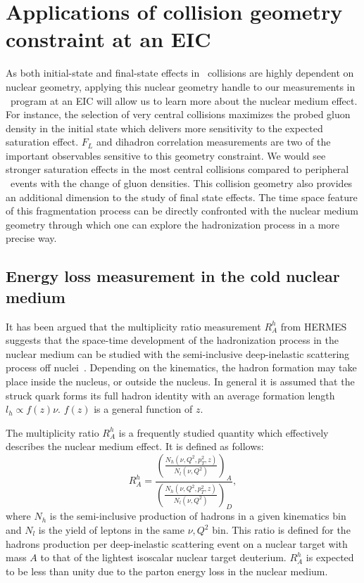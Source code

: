 \section{Applications of collision geometry constraint at an EIC}\label{sec:application}

As both initial-state and final-state effects in \eA\ collisions are highly dependent
on nuclear geometry, applying this nuclear geometry handle to our
measurements in \eA\ program at an EIC will allow us to learn more
about the nuclear medium effect. For instance, the selection of very
central collisions maximizes the probed gluon density in the initial state which
delivers more sensitivity to the expected saturation effect. $F_{L}$ and dihadron
correlation measurements are two of the important observables sensitive to this
geometry constraint. We would see stronger saturation effects in the most
central collisions compared to peripheral \eA\ events with the change of
gluon densities. This collision geometry also provides an additional dimension to
the study of final state effects. The time space feature of this fragmentation
process can be directly confronted with the nuclear medium geometry through
which one can explore the hadronization process in a more precise way.


\subsection{Energy loss measurement in the cold nuclear medium}
It has been argued that the multiplicity ratio measurement $R^{h}_{A}$ from
HERMES suggests that the space-time development of the hadronization process in
the nuclear medium can be studied with the semi-inclusive deep-inelastic
scattering process off nuclei~\cite{Airapetian:2003mi,Airapetian:2007vu,Airapetian:2011jp}. Depending on the
kinematics, the hadron formation may take place inside the nucleus, or
outside the nucleus. In general it is assumed that the struck quark forms its
full hadron identity with an average formation length $l_{h}\propto f(z)\nu$. $f(z)$ is a general function of $z$.

The multiplicity ratio $R^{h}_{A}$ is a frequently studied quantity
which effectively describes the nuclear medium effect. It is defined as follows:
\begin{equation}
R^{h}_{A}=\frac{(\frac{N_{h}(\nu,Q^{2},p^{2}_{T},z)}{N_{l}(\nu,Q^{2})})_{A}}{(\frac{N_{h}(\nu,Q^{2},p^{2}_{T},z)}{N_{l}(\nu,Q^{2})})_{D}},
\end{equation}
where $N_{h}$ is the semi-inclusive production of hadrons in a given kinematics
bin and $N_{l}$ is the yield of leptons in the same $\nu,Q^{2}$ bin. This ratio
is defined for the hadrons production per deep-inelastic scattering event on a
nuclear target with mass $A$ to that of the lightest isoscalar nuclear target
deuterium. $R^{h}_{A}$ is expected to be less than unity due to the parton energy loss in the nuclear medium.


